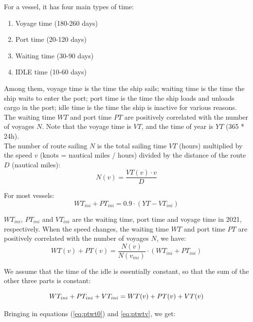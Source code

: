 \documentclass[a4paper,12pt]{article}
\begin{document}
For a vessel, it has four main types of time:
\begin{enumerate}
	\item Voyage time (180-260 days)
	\item Port time (20-120 days)
	\item Waiting time (30-90 days)
	\item IDLE time (10-60 days)
\end{enumerate}

Among them, voyage time is the time the ship sails; waiting time is the time the ship waits to enter the port; port time is the time the ship loads and unloads cargo in the port; idle time is the time the ship is inactive for various reasons.
The waiting time $WT$ and port time $PT$ are positively correlated with the number of voyages $N$.
Note that the voyage time is $VT$, and the time of year is $YT$ (365 * 24h). \\

The number of route sailing $N$ is the total sailing time $VT$ (hours) multiplied by the speed $v$ (knots = nautical miles / hours) divided by the distance of the route $D$ (nautical miles):
\begin{equation}
	\label{eq:vt}
	N(v) = \frac{VT(v) \cdot v }{D}
\end{equation}

For most vessels:
\begin{equation}
	\label{eq:ptwt0}
	WT_{ini}+PT_{ini} = 0.9 \cdot (YT-VT_{ini})
\end{equation}

$WT_{ini}$, $PT_{ini}$ and $VT_{ini}$ are the waiting time, port time and voyage time in 2021, respectively.
When the speed changes, the waiting time $WT$ and port time $PT$ are positively correlated with the number of voyages $N$, we have:
\begin{equation}
	\label{eq:ptwtv}
	WT(v)+PT(v) = \frac{N(v)}{N(v_{ini})} \cdot (WT_{ini} + PT_{ini})
\end{equation}

We assume that the time of the idle is essentially constant, so that the sum of the other three parts is constant:

\begin{equation}
	\label{eq:constant_sum1}
	WT_{ini}+PT_{ini}+VT_{ini} = WT(v)+PT(v)+VT(v)\\
\end{equation}

Bringing in equations (\ref{eq:ptwt0}) and \ref{eq:ptwtv}, we get:
\end{document}
